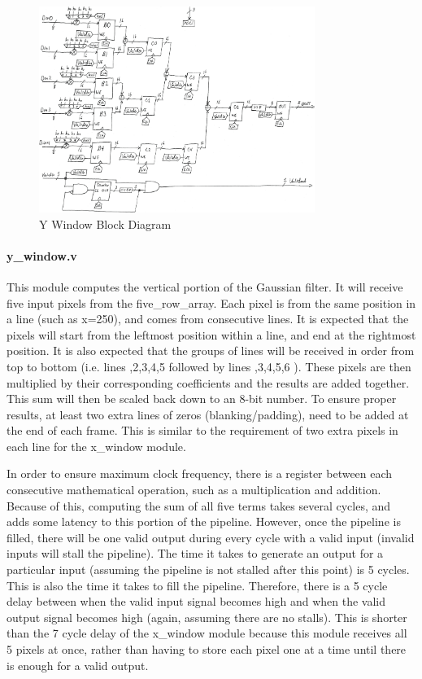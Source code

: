 \begin{figure}
    \centering
    \includegraphics[width=0.8\textwidth]{processed_image_pngs/y_window.png}
    \caption{Y Window Block Diagram}
    \label{fig:y_window}
\end{figure}



\paragraph{y\_window.v} 

This module computes the vertical portion of the Gaussian filter. It 
will receive five input pixels from the five\_row\_array. Each pixel is from the 
same position in a line (such as x=250), and comes from consecutive lines. It is 
expected that the pixels will start from the leftmost position within a line, 
and end at the rightmost position. It is also expected that the groups of lines 
will be received in order from top to bottom (i.e. lines ,2,3,4,5 \rbrack followed by 
lines ,3,4,5,6 \rbrack). These pixels are then multiplied by their corresponding 
coefficients and the results are added together. This sum will then be scaled 
back down to an 8-bit number. To ensure proper results, at least two extra lines 
of zeros (blanking/padding), need to be added at the end of each frame. This is 
similar to the requirement of two extra pixels in each line for the x\_window 
module.

In order to ensure maximum clock frequency, there is a register between each 
consecutive mathematical operation, such as a multiplication and addition. 
Because of this, computing the sum of all five terms takes several cycles, and 
adds some latency to this portion of the pipeline. However, once the pipeline is 
filled, there will be one valid output during every cycle with a valid input 
(invalid inputs will stall the pipeline). The time it takes to generate an 
output for a particular input (assuming the pipeline is not stalled after this 
point) is 5 cycles. This is also the time it takes to fill the pipeline. 
Therefore, there is a 5 cycle delay between when the valid input signal becomes 
high and when the valid output signal becomes high (again, assuming there are no 
stalls). This is shorter than the 7 cycle delay of the x\_window module because 
this module receives all 5 pixels at once, rather than having to store each 
pixel one at a time until there is enough for a valid output.

